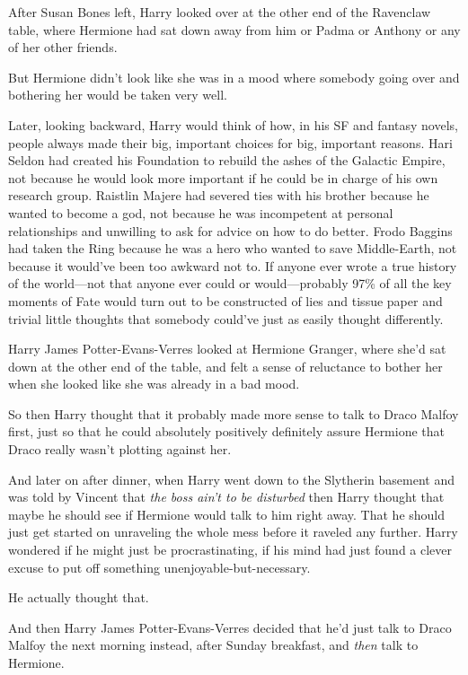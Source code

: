 After Susan Bones left, Harry looked over at the other end of the Ravenclaw
table, where Hermione had sat down away from him or Padma or Anthony or any of
her other friends.

But Hermione didn't look like she was in a mood where somebody going over and
bothering her would be taken very well.

Later, looking backward, Harry would think of how, in his SF and fantasy
novels, people always made their big, important choices for big, important
reasons. Hari Seldon had created his Foundation to rebuild the ashes of the
Galactic Empire, not because he would look more important if he could be in
charge of his own research group. Raistlin Majere had severed ties with his
brother because he wanted to become a god, not because he was incompetent at
personal relationships and unwilling to ask for advice on how to do better.
Frodo Baggins had taken the Ring because he was a hero who wanted to save
Middle-Earth, not because it would've been too awkward not to. If anyone ever
wrote a true history of the world---not that anyone ever could or
would---probably 97\% of all the key moments of Fate would turn out to be
constructed of lies and tissue paper and trivial little thoughts that somebody
could've just as easily thought differently.

Harry James Potter-Evans-Verres looked at Hermione Granger, where she'd sat
down at the other end of the table, and felt a sense of reluctance to bother
her when she looked like she was already in a bad mood.

So then Harry thought that it probably made more sense to talk to Draco Malfoy
first, just so that he could absolutely positively definitely assure Hermione
that Draco really wasn't plotting against her.

And later on after dinner, when Harry went down to the Slytherin basement and
was told by Vincent that \emph{the boss ain't to be disturbed}{\el} then
Harry thought that maybe he should see if Hermione would talk to him right
away. That he should just get started on unraveling the whole mess before it
raveled any further. Harry wondered if he might just be procrastinating, if his
mind had just found a clever excuse to put off something
unenjoyable-but-necessary.

He actually thought that.

And then Harry James Potter-Evans-Verres decided that he'd just talk to Draco
Malfoy the next morning instead, after Sunday breakfast, and \emph{then} talk
to Hermione.

